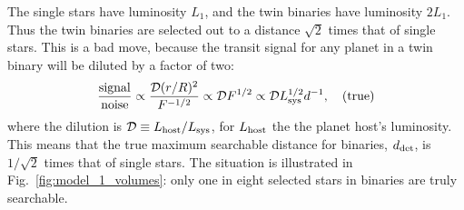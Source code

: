 The single stars have luminosity $L_1$, and the twin binaries have luminosity 
$2L_1$.
Thus the twin binaries are selected out to a distance $\sqrt{2}$ times 
that of single stars.
This is a bad move, because the transit signal for any planet in a 
twin binary will be diluted by a factor of two:
\begin{equation}
\frac{{\rm signal}}{{\rm noise}}
\propto \frac{\mathcal{D} (r/R)^2}{F^{-1/2}}
\propto \mathcal{D} F^{1/2}
\propto \mathcal{D} L_{\rm sys}^{1/2} d^{-1}, \quad ({\rm true})
\label{eq:snr_true}
\end{equation}
where the dilution is $\mathcal{D} \equiv L_{\rm host}/L_{\rm sys}$, for 
$L_{\rm host}$ the the planet host's luminosity.
This means that the true maximum searchable distance for binaries, $d_{\rm 
det}$, is $1/\sqrt{2}$ times that of single stars.
The situation is illustrated in Fig.~\ref{fig:model_1_volumes}: only one in 
eight selected stars in binaries are truly searchable.

